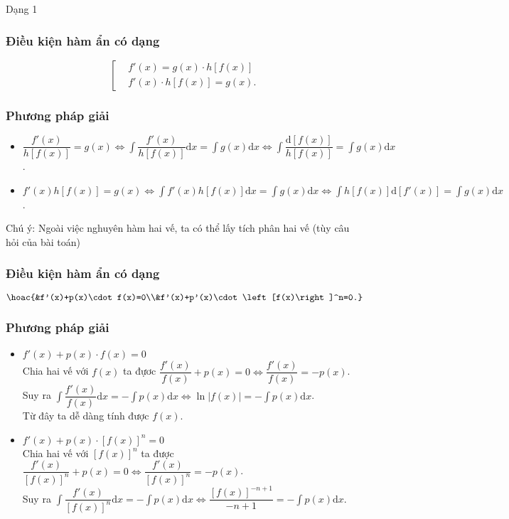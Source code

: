 \begin{dang}{Dạng 1}
\subsubsection{Điều kiện hàm ẩn có dạng}
	$$\left[ \begin{aligned}
		& f'(x)=g(x)\cdot h\left[ f(x) \right] \\ 
		& f'(x)\cdot h\left[ f(x) \right]=g(x). 
	\end{aligned} \right.$$
\subsubsection*{Phương pháp giải}
	\begin{itemize}[\color{blue}\faPencilSquareO]
		\item $\dfrac{f'(x)}{h[f(x)]}=g(x) \Leftrightarrow \displaystyle\int\!\dfrac{f'(x)}{h[f(x)]}\mathrm{d}x =\int\!\!{g(x)}\mathrm{d}x \Leftrightarrow \int\dfrac{\mathrm{d}\left[ f(x) \right]}{h\left[ f(x) \right]} =\int\!\!{g(x)\mathrm{d}x}$.
		\item $f'(x)h[f(x)]=g(x)
		\Leftrightarrow 
		\displaystyle\int\!f'(x)h[f(x)]\mathrm{d}x=\int\!\!g(x)\mathrm{d}x
		\Leftrightarrow 
		\int\!h[f(x)]\mathrm{d}\left[ f'(x) \right]=\int\!\!g(x)\mathrm{d}x$.
	\end{itemize}
	Chú ý: Ngoài việc nghuyên hàm hai vế, ta có thể lấy tích phân hai vế (tùy câu hỏi của bài toán)
\subsubsection{Điều kiện hàm ẩn có dạng}
	$$\hoac{&f'(x)+p(x)\cdot f(x)=0\\&f'(x)+p'(x)\cdot\left[f(x)\right]^n=0.}$$
\subsubsection*{Phương pháp giải}
	\begin{itemize}[\color{magenta}\faPencilSquareO]
		\item $f'(x)+p(x)\cdot f(x)=0$\\
		Chia hai vế với $f(x)$ ta đựơc $\dfrac{f'(x)}{f(x)}+p(x)=0 \Leftrightarrow \dfrac{f'(x)}{f(x)}=-p(x)$.\\
		Suy ra $\displaystyle\int\!\dfrac{f'(x)}{f(x)}\mathrm{d}x=-\int\!\!p(x)\mathrm{d}x \Leftrightarrow \ln|f(x)|=-\int\!\!p(x)\mathrm{d}x$.\\
		Từ đây ta dễ dàng tính được $f(x)$.
		\item $f'(x)+p(x)\cdot \left[ f(x) \right]^n=0$ \\
		Chia hai vế với $\left[ f(x) \right]^n$ ta được $\dfrac{f'(x)}{\left[ f(x) \right]^n}+p(x)=0 \Leftrightarrow \dfrac{f'(x)}{\left[ f(x) \right]^n}=-p(x)$.\\
		Suy ra $\displaystyle\int\!\dfrac{f'(x)}{\left[ f(x) \right]^n}\mathrm{d}x =-\int\!\!p(x)\mathrm{d}x \Leftrightarrow \dfrac{\left[ f(x) \right]^{-n+1}}{-n+1} =-\int\!\!p(x)\mathrm{d}x$.
	\end{itemize}

\end{dang}
